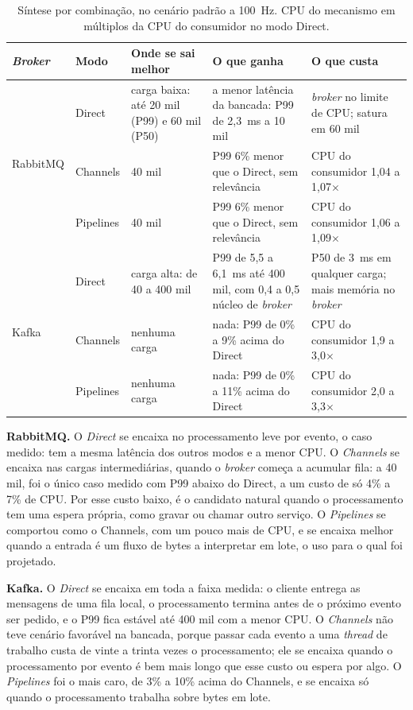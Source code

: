 \documentclass[12pt]{article}
\begin{document}
\begin{table}[ht]
\centering
\caption{Síntese por combinação, no cenário padrão a 100~Hz. CPU do mecanismo em
múltiplos da CPU do consumidor no modo Direct.}
\label{tab:sintese}
\small
\begin{tabular}{|l|l|p{3.0cm}|p{4.1cm}|p{3.7cm}|}
\hline
\textbf{\textit{Broker}} & \textbf{Modo} & \textbf{Onde se sai melhor} & \textbf{O que ganha} & \textbf{O que custa} \\
\hline
\multirow{3}{*}{RabbitMQ} & Direct & carga baixa: até 20 mil (P99) e 60 mil (P50) & a menor latência da bancada: P99 de 2,3~ms a 10 mil & \textit{broker} no limite de CPU; satura em 60 mil \\
\cline{2-5}
 & Channels & 40 mil & P99 6\% menor que o Direct, sem relevância & CPU do consumidor 1,04 a 1,07$\times$ \\
\cline{2-5}
 & Pipelines & 40 mil & P99 6\% menor que o Direct, sem relevância & CPU do consumidor 1,06 a 1,09$\times$ \\
\hline
\multirow{3}{*}{Kafka} & Direct & carga alta: de 40 a 400 mil & P99 de 5,5 a 6,1~ms até 400 mil, com 0,4 a 0,5 núcleo de \textit{broker} & P50 de 3~ms em qualquer carga; mais memória no \textit{broker} \\
\cline{2-5}
 & Channels & nenhuma carga & nada: P99 de 0\% a 9\% acima do Direct & CPU do consumidor 1,9 a 3,0$\times$ \\
\cline{2-5}
 & Pipelines & nenhuma carga & nada: P99 de 0\% a 11\% acima do Direct & CPU do consumidor 2,0 a 3,3$\times$ \\
\hline
\end{tabular}
\end{table}

\textbf{RabbitMQ.} O \textit{Direct} se encaixa no processamento leve por evento, o caso
medido: tem a mesma latência dos outros modos e a menor CPU. O \textit{Channels} se
encaixa nas cargas intermediárias, quando o \textit{broker} começa a acumular fila: a 40 mil, foi o
único caso medido com P99 abaixo do Direct, a um custo de só 4\% a 7\% de CPU. Por esse
custo baixo, é o candidato natural quando o processamento tem uma espera própria, como
gravar ou chamar outro serviço. O \textit{Pipelines} se comportou como o Channels, com um
pouco mais de CPU, e se encaixa melhor quando a entrada é um fluxo de bytes a interpretar
em lote, o uso para o qual foi projetado.

\textbf{Kafka.} O \textit{Direct} se encaixa em toda a faixa medida: o cliente entrega as
mensagens de uma fila local, o processamento termina antes de o próximo evento ser pedido,
e o P99 fica estável até 400 mil com a menor CPU. O \textit{Channels} não teve cenário
favorável na bancada, porque passar cada evento a uma \textit{thread} de trabalho custa de vinte a
trinta vezes o processamento; ele se encaixa quando o processamento por evento é bem mais
longo que esse custo ou espera por algo. O \textit{Pipelines} foi o mais caro, de 3\% a
10\% acima do Channels, e se encaixa só quando o processamento trabalha sobre bytes em
lote.
\end{document}
